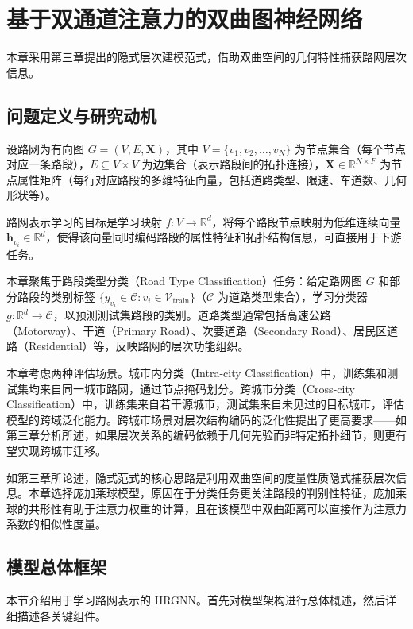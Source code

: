 \chapter{基于双通道注意力的双曲图神经网络}

本章采用第三章提出的隐式层次建模范式，借助双曲空间的几何特性捕获路网层次信息。

\section{问题定义与研究动机}

设路网为有向图 $G = (V, E, \mathbf{X})$，其中 $V = \{v_1, v_2, \ldots, v_N\}$ 为节点集合（每个节点对应一条路段），$E \subseteq V \times V$ 为边集合（表示路段间的拓扑连接），$\mathbf{X} \in \mathbb{R}^{N \times F}$ 为节点属性矩阵（每行对应路段的多维特征向量，包括道路类型、限速、车道数、几何形状等）。

路网表示学习的目标是学习映射 $f: V \to \mathbb{R}^d$，将每个路段节点映射为低维连续向量 $\mathbf{h}_{v_i} \in \mathbb{R}^d$，使得该向量同时编码路段的属性特征和拓扑结构信息，可直接用于下游任务。

本章聚焦于路段类型分类（Road Type Classification）任务：给定路网图 $G$ 和部分路段的类别标签 $\{y_{v_i} \in \mathcal{C} : v_i \in \mathcal{V}_{\text{train}}\}$（$\mathcal{C}$ 为道路类型集合），学习分类器 $g: \mathbb{R}^d \to \mathcal{C}$，以预测测试集路段的类别。道路类型通常包括高速公路（Motorway）、干道（Primary Road）、次要道路（Secondary Road）、居民区道路（Residential）等，反映路网的层次功能组织。

本章考虑两种评估场景。城市内分类（Intra-city Classification）中，训练集和测试集均来自同一城市路网，通过节点掩码划分。跨城市分类（Cross-city Classification）中，训练集来自若干源城市，测试集来自未见过的目标城市，评估模型的跨域泛化能力。跨城市场景对层次结构编码的泛化性提出了更高要求——如第三章分析所述，如果层次关系的编码依赖于几何先验而非特定拓扑细节，则更有望实现跨城市迁移。

如第三章所论述，隐式范式的核心思路是利用双曲空间的度量性质隐式捕获层次信息。本章选择庞加莱球模型，原因在于分类任务更关注路段的判别性特征，庞加莱球的共形性有助于注意力权重的计算，且在该模型中双曲距离可以直接作为注意力系数的相似性度量。

\section{模型总体框架}

本节介绍用于学习路网表示的 HRGNN。首先对模型架构进行总体概述，然后详细描述各关键组件。

